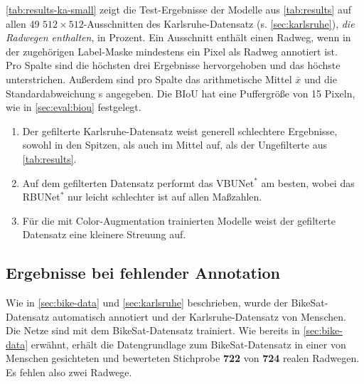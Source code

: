 \autoref{tab:results-ka-small} zeigt die Test-Ergebnisse der Modelle aus \autoref{tab:results} 
auf allen 49 $512{\times}512$-Ausschnitten des Karlsruhe-Datensatz (s. \autoref{sec:karlsruhe}), 
\textit{die Radwegen enthalten}, in Prozent. 
Ein Ausschnitt enthält einen Radweg, wenn in der zugehörigen Label-Maske mindestens ein Pixel als Radweg annotiert ist. \\
Pro Spalte sind die höchsten drei Ergebnisse hervorgehoben und das höchste unterstrichen.
Außerdem sind pro Spalte das arithmetische Mittel $\bar{x}$ und die Standardabweichung s angegeben. 
Die \ac{BIoU} hat eine Puffergröße von 15 Pixeln, wie in \autoref{sec:eval:biou} festgelegt.
\begin{enumerate}
	\item Der gefilterte Karlsruhe-Datensatz weist generell schlechtere Ergebnisse, sowohl in den Spitzen, als auch im Mittel auf, 
	als der Ungefilterte aus \autoref{tab:results}.
	\item Auf dem gefilterten Datensatz performt das VBUNet$^*$ am besten, wobei das RBUNet$^*$ nur leicht schlechter ist auf allen Maßzahlen.
	\item Für die mit Color-Augmentation trainierten Modelle weist der gefilterte Datensatz eine kleinere Streuung auf. 
\end{enumerate}

\subsection{Ergebnisse bei fehlender Annotation}

Wie in \autoref{sec:bike-data} und \ref{sec:karlsruhe} beschrieben, wurde der BikeSat-Datensatz automatisch 
annotiert und der Karlsruhe-Datensatz von Menschen. Die Netze sind mit dem BikeSat-Datensatz trainiert. 
Wie bereits in \autoref{sec:bike-data} erwähnt, erhält die Datengrundlage zum BikeSat-Datensatz 
in einer von Menschen gesichteten und bewerteten Stichprobe \textbf{722} von \textbf{724} realen Radwegen.
Es fehlen also zwei Radwege. 

